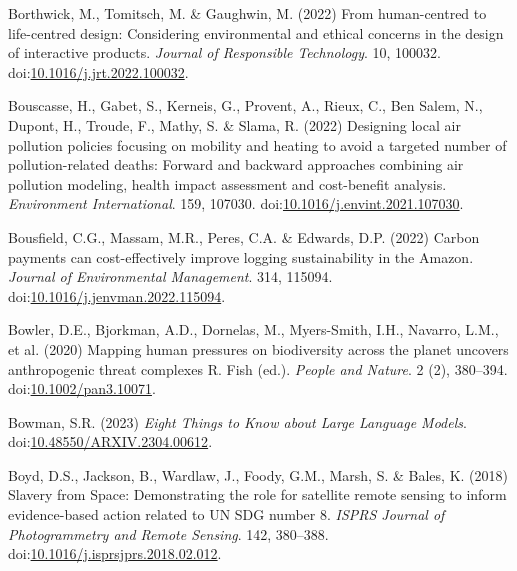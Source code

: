 \documentclass[
  letterpaper,
  DIV=11,
  numbers=noendperiod]{scrartcl}
\newlength{\cslhangindent}
\newenvironment{CSLReferences}[2] %
 {\begin{list}{}{%
  \setlength{\itemindent}{0pt}
  \setlength{\leftmargin}{0pt}
  \setlength{\parsep}{0pt}
  \ifodd #1
   \setlength{\leftmargin}{\cslhangindent}
   \setlength{\itemindent}{-1\cslhangindent}
  \fi
  \setlength{\itemsep}{#2\baselineskip}}}
 {\end{list}}
\begin{document}
\begin{CSLReferences}{0}{1}
Borthwick, M., Tomitsch, M. \& Gaughwin, M. (2022) From human-centred to
life-centred design: {Considering} environmental and ethical concerns in
the design of interactive products. \emph{Journal of Responsible
Technology}. 10, 100032.
doi:\href{https://doi.org/10.1016/j.jrt.2022.100032}{10.1016/j.jrt.2022.100032}.

Bouscasse, H., Gabet, S., Kerneis, G., Provent, A., Rieux, C., Ben
Salem, N., Dupont, H., Troude, F., Mathy, S. \& Slama, R. (2022)
Designing local air pollution policies focusing on mobility and heating
to avoid a targeted number of pollution-related deaths: {Forward} and
backward approaches combining air pollution modeling, health impact
assessment and cost-benefit analysis. \emph{Environment International}.
159, 107030.
doi:\href{https://doi.org/10.1016/j.envint.2021.107030}{10.1016/j.envint.2021.107030}.

Bousfield, C.G., Massam, M.R., Peres, C.A. \& Edwards, D.P. (2022)
Carbon payments can cost-effectively improve logging sustainability in
the {Amazon}. \emph{Journal of Environmental Management}. 314, 115094.
doi:\href{https://doi.org/10.1016/j.jenvman.2022.115094}{10.1016/j.jenvman.2022.115094}.

Bowler, D.E., Bjorkman, A.D., Dornelas, M., Myers-Smith, I.H., Navarro,
L.M., et al. (2020) Mapping human pressures on biodiversity across the
planet uncovers anthropogenic threat complexes R. Fish (ed.).
\emph{People and Nature}. 2 (2), 380--394.
doi:\href{https://doi.org/10.1002/pan3.10071}{10.1002/pan3.10071}.

Bowman, S.R. (2023) \emph{Eight {Things} to {Know} about {Large Language
Models}}.
doi:\href{https://doi.org/10.48550/ARXIV.2304.00612}{10.48550/ARXIV.2304.00612}.

Boyd, D.S., Jackson, B., Wardlaw, J., Foody, G.M., Marsh, S. \& Bales,
K. (2018) Slavery from {Space}: {Demonstrating} the role for satellite
remote sensing to inform evidence-based action related to {UN SDG}
number 8. \emph{ISPRS Journal of Photogrammetry and Remote Sensing}.
142, 380--388.
doi:\href{https://doi.org/10.1016/j.isprsjprs.2018.02.012}{10.1016/j.isprsjprs.2018.02.012}.


\end{CSLReferences}
\end{document}
